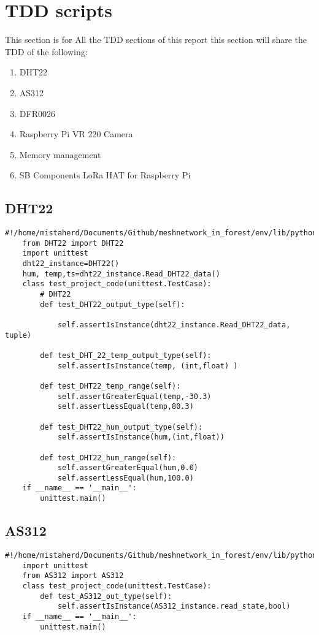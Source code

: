 \section{TDD scripts}
This section is  for All  the TDD sections of  this  report this  section will share the TDD of the following:
\begin{enumerate}
    \item DHT22
    \item AS312
    \item DFR0026
    \item Raspberry Pi VR 220 Camera
    \item Memory management
    \item SB Components LoRa HAT for Raspberry Pi
\end{enumerate}
\subsection{DHT22}
\begin{lstlisting}[style=mystyle,caption={DHT22 unit test}]
    #!/home/mistaherd/Documents/Github/meshnetwork_in_forest/env/lib/python3.11
    from DHT22 import DHT22
    import unittest
    dht22_instance=DHT22()
    hum, temp,ts=dht22_instance.Read_DHT22_data()
    class test_project_code(unittest.TestCase):
        # DHT22
        def test_DHT22_output_type(self):
           
            self.assertIsInstance(dht22_instance.Read_DHT22_data, tuple)
    
        def test_DHT_22_temp_output_type(self):
            self.assertIsInstance(temp, (int,float) )
    
        def test_DHT22_temp_range(self):
            self.assertGreaterEqual(temp,-30.3)
            self.assertLessEqual(temp,80.3)
    
        def test_DHT22_hum_output_type(self):
            self.assertIsInstance(hum,(int,float))
    
        def test_DHT22_hum_range(self):
            self.assertGreaterEqual(hum,0.0)
            self.assertLessEqual(hum,100.0) 
    if __name__ == '__main__':
        unittest.main() 
\end{lstlisting}
\newpage
\subsection{AS312}
\begin{lstlisting}[style=mystyle,caption={Code for unit test  of AS312}]
    #!/home/mistaherd/Documents/Github/meshnetwork_in_forest/env/lib/python3.11
    import unittest
    from AS312 import AS312
    class test_project_code(unittest.TestCase):
        def test_AS312_out_type(self):
            self.assertIsInstance(AS312_instance.read_state,bool)
    if __name__ == '__main__':
        unittest.main()
\end{lstlisting}
\newpage
